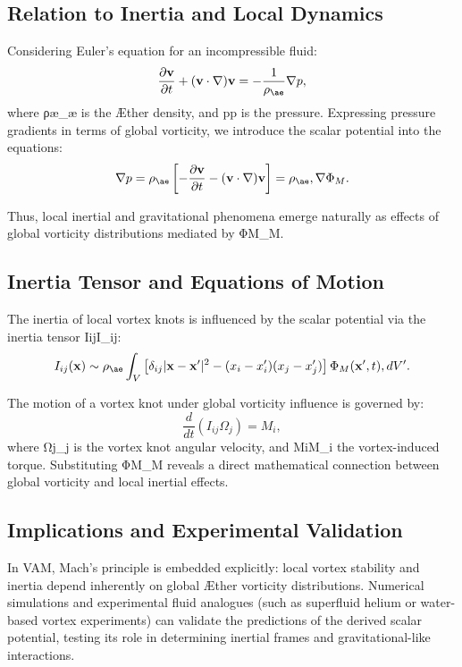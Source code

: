 \documentclass[aps,preprint,superscriptaddress]{revtex4-2}
\begin{document}
\subsection{Relation to Inertia and Local Dynamics}
Considering Euler's equation for an incompressible fluid:
\begin{equation}
\frac{\partial \mathbf{v}}{\partial t}+(\mathbf{v}\cdot \nabla)\mathbf{v}=-\frac{1}{\rho_{\ae}}\nabla p,
\end{equation}
where ρ\ae\rho_{\ae} is the Æther density, and pp is the pressure. Expressing pressure gradients in terms of global vorticity, we introduce the scalar potential into the equations:
\begin{equation}
\nabla p = \rho_{\ae}\left[-\frac{\partial\mathbf{v}}{\partial t} - (\mathbf{v}\cdot\nabla)\mathbf{v}\right] = \rho_{\ae}, \nabla \Phi_M.
\end{equation}


Thus, local inertial and gravitational phenomena emerge naturally as effects of global vorticity distributions mediated by ΦM\Phi_M.


\subsection{Inertia Tensor and Equations of Motion}
The inertia of local vortex knots is influenced by the scalar potential via the inertia tensor IijI_{ij}:
\begin{equation}
I_{ij}(\mathbf{x}) \sim \rho_{\ae}\int_V \left[\delta_{ij}|\mathbf{x}-\mathbf{x}'|^2 - (x_i - x'_i)(x_j - x'_j)\right]\Phi_M(\mathbf{x}',t), dV'.
\end{equation}


The motion of a vortex knot under global vorticity influence is governed by:
\begin{equation}
\frac{d}{dt}(I_{ij}\Omega_j) = M_i,
\end{equation}
where Ωj\Omega_j is the vortex knot angular velocity, and MiM_i the vortex-induced torque. Substituting ΦM\Phi_M reveals a direct mathematical connection between global vorticity and local inertial effects.


\subsection{Implications and Experimental Validation}
In VAM, Mach's principle is embedded explicitly: local vortex stability and inertia depend inherently on global Æther vorticity distributions. Numerical simulations and experimental fluid analogues (such as superfluid helium or water-based vortex experiments) can validate the predictions of the derived scalar potential, testing its role in determining inertial frames and gravitational-like interactions.
\end{document}
